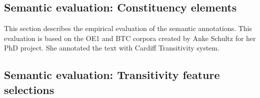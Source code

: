 \begin{table}[!ht]
    \caption{The evaluation statistics for WH-SELECTION systemic choices}
    \label{tab:features-mood3}
\end{table}


\subsection{Semantic evaluation: Constituency elements}

This section describes the empirical evaluation of the semantic annotations. This evaluation is based on the OE1 and BTC corpora created by Anke Schultz for her PhD project. She annotated the text with Cardiff Transitivity system.

\subsection{Semantic evaluation: Transitivity feature selections}


